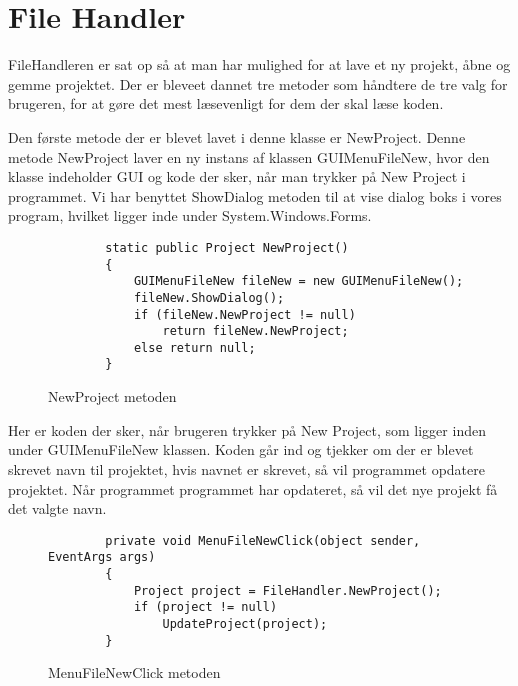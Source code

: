 \chapter{File Handler}\label{FileHandler}

FileHandleren er sat op så at man har mulighed for at lave et ny projekt, åbne og gemme projektet. Der er bleveet dannet tre metoder som håndtere de tre valg for brugeren, for at gøre det mest læsevenligt for dem der skal læse koden.   

\vspace{5mm}

Den første metode der er blevet lavet i denne klasse er NewProject. Denne metode NewProject laver en ny instans af klassen GUIMenuFileNew, hvor den klasse indeholder GUI og kode der sker, når man trykker på New Project i programmet. Vi har benyttet ShowDialog metoden til at vise dialog boks i vores program, hvilket ligger inde under System.Windows.Forms.

\begin{figure}[H]
\begin{lstlisting}
 		static public Project NewProject()
        {
            GUIMenuFileNew fileNew = new GUIMenuFileNew();
            fileNew.ShowDialog();
            if (fileNew.NewProject != null)
                return fileNew.NewProject;
            else return null;
        }
\end{lstlisting}
\caption{NewProject metoden}
\end{figure}

\vspace{5mm}

Her er koden der sker, når brugeren trykker på New Project, som ligger inden under GUIMenuFileNew klassen. Koden går ind og tjekker om der er blevet skrevet navn til projektet, hvis navnet er skrevet, så vil programmet opdatere projektet. Når programmet programmet har opdateret, så vil det nye projekt få det valgte navn.

\begin{figure}[H]
\begin{lstlisting}
        private void MenuFileNewClick(object sender, EventArgs args)
        {
            Project project = FileHandler.NewProject();
            if (project != null)
                UpdateProject(project);
        }
\end{lstlisting}
\caption{MenuFileNewClick metoden}
\end{figure}

\vspace{5mm}


